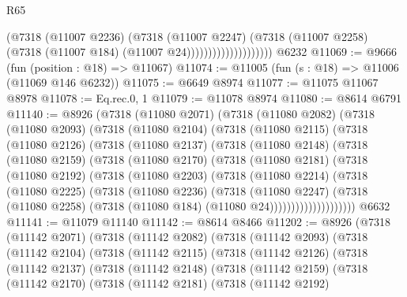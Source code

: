 \begin{lexlean}{R65}
\begin{coremodule}
{                                  (@7318
                                    (@11007 @2236)
                                    (@7318
                                      (@11007 @2247)
                                      (@7318
                                        (@11007 @2258)
                                        (@7318 (@11007 @184) (@11007 @24))))))))))))))))))))
    @6232
@11069 := @9666 (fun (position : @18) => @11067)
@11074 := @11005 (fun (s : @18) => @11006 (@11069 @146 @6232))
@11075 := @6649 @8974
@11077 := @11075 @11067 @8978
@11078 := Eq.rec.{0, 1}
@11079 := @11078 @8974
@11080 := @8614 @6791
@11140 := @8926
    (@7318
      (@11080 @2071)
      (@7318
        (@11080 @2082)
        (@7318
          (@11080 @2093)
          (@7318
            (@11080 @2104)
            (@7318
              (@11080 @2115)
              (@7318
                (@11080 @2126)
                (@7318
                  (@11080 @2137)
                  (@7318
                    (@11080 @2148)
                    (@7318
                      (@11080 @2159)
                      (@7318
                        (@11080 @2170)
                        (@7318
                          (@11080 @2181)
                          (@7318
                            (@11080 @2192)
                            (@7318
                              (@11080 @2203)
                              (@7318
                                (@11080 @2214)
                                (@7318
                                  (@11080 @2225)
                                  (@7318
                                    (@11080 @2236)
                                    (@7318
                                      (@11080 @2247)
                                      (@7318
                                        (@11080 @2258)
                                        (@7318 (@11080 @184) (@11080 @24))))))))))))))))))))
    @6632
@11141 := @11079 @11140
@11142 := @8614 @8466
@11202 := @8926
    (@7318
      (@11142 @2071)
      (@7318
        (@11142 @2082)
        (@7318
          (@11142 @2093)
          (@7318
            (@11142 @2104)
            (@7318
              (@11142 @2115)
              (@7318
                (@11142 @2126)
                (@7318
                  (@11142 @2137)
                  (@7318
                    (@11142 @2148)
                    (@7318
                      (@11142 @2159)
                      (@7318
                        (@11142 @2170)
                        (@7318
                          (@11142 @2181)
                          (@7318
                            (@11142 @2192)
}
\end{coremodule}
\end{lexlean}
